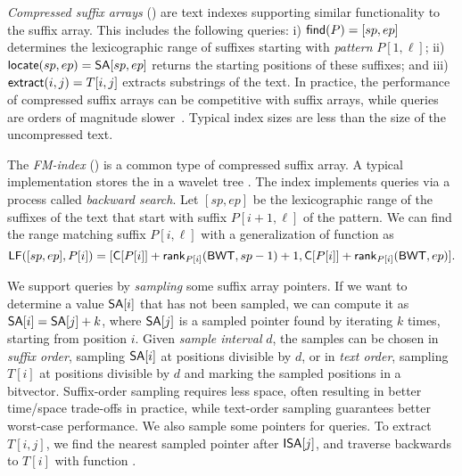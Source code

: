 \emph{Compressed suffix arrays} (\CSA) \cite{Ferragina2005a,Grossi2005} are
text indexes supporting similar functionality to the suffix array. This
includes the following queries: i) $\mathsf{find}(P) = [sp,ep]$ determines the
lexicographic range of suffixes starting with \emph{pattern} $P[1,\ell]$; ii)
$\mathsf{locate}(sp,ep) = \mathsf{SA}[sp,ep]$ returns the starting positions of these
suffixes; and iii) $\mathsf{extract}(i,j) = T[i,j]$ extracts substrings of the text.
In practice, the \find{} performance of compressed suffix arrays can be
competitive with suffix arrays, while \locate{} queries are orders of
magnitude slower~\cite{Ferragina2009a}. Typical index sizes are less than the
size of the uncompressed text.

The \emph{FM-index} (\FMI) \cite{Ferragina2005a} is a common type of
compressed suffix array. A typical implementation stores the \BWT{} in a
wavelet tree \cite{Grossi2003}. The index implements \find{} queries via a
process called \emph{backward search}. Let $[sp,ep]$ be the lexicographic
range of the suffixes of the text that start with suffix $P[i+1,\ell]$ of the
pattern. We can find the range matching suffix $P[i,\ell]$ with a
generalization of function \LF{} as
$$
\mathsf{LF}([sp,ep],P[i]) =
[\mathsf{C}[P[i]] + \mathsf{rank}_{P[i]}(\mathsf{BWT}, sp-1) + 1,
\mathsf{C}[P[i]] + \mathsf{rank}_{P[i]}(\mathsf{BWT}, ep)].
$$

We support \locate{} queries by \emph{sampling} some suffix array pointers. If
we want to determine a value $\mathsf{SA}[i]$ that has not been sampled, we can
compute it as $\mathsf{SA}[i] = \mathsf{SA}[j]+k$, where $\mathsf{SA}[j]$ is a sampled pointer
found by iterating \LF{} $k$ times, starting from position $i$. Given
\emph{sample interval} $d$, the samples can be chosen in \emph{suffix order},
sampling $\mathsf{SA}[i]$ at positions divisible by $d$, or in \emph{text order},
sampling $T[i]$ at positions divisible by $d$ and marking the sampled \SA{}
positions in a bitvector. Suffix-order sampling requires less space, often
resulting in better time/space trade-offs in practice, while text-order
sampling guarantees better worst-case performance. We also sample some \ISA{}
pointers for \extract{} queries. To extract $T[i,j]$, we find the nearest
sampled pointer after $\mathsf{ISA}[j]$, and traverse backwards to $T[i]$ with
function \LF.

